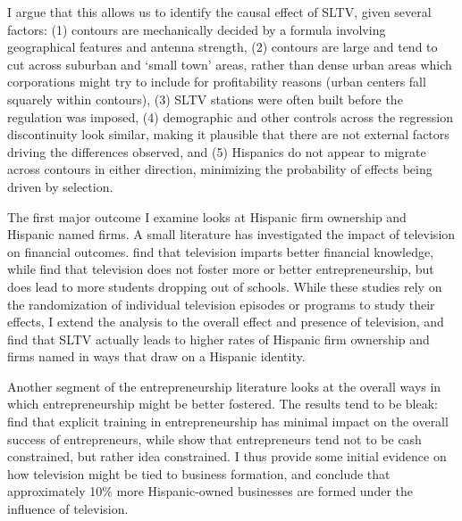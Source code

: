 \documentclass[11pt]{article}
\begin{document}
I argue that this allows us to identify the causal effect of SLTV, given several factors: (1) contours are mechanically decided by a formula involving geographical features and antenna strength, (2) contours are large and tend to cut across suburban and `small town' areas, rather than dense urban areas which corporations might try to include for profitability reasons (urban centers fall squarely within contours), (3) SLTV stations were often built before the regulation was imposed, (4) demographic and other controls across the regression discontinuity look similar, making it plausible that there are not external factors driving the differences observed, and (5) Hispanics do not appear to migrate across contours in either direction, minimizing the probability of effects being driven by selection.

The first major outcome I examine looks at Hispanic firm ownership and Hispanic named firms. A small literature has investigated the impact of television on financial outcomes. \cite{bjorvatn_teaching_2019} find that television imparts better financial knowledge, while \cite{berg_harnessing_2017} find that television does not foster more or better entrepreneurship, but does lead to more students dropping out of schools. While these studies rely on the randomization of individual television episodes or programs to study their effects, I extend the analysis to the overall effect and presence of television, and find that SLTV actually leads to higher rates of Hispanic firm ownership and firms named in ways that draw on a Hispanic identity.

Another segment of the entrepreneurship literature looks at the overall ways in which entrepreneurship might be better fostered. The results tend to be bleak: \cite{karlan_teaching_2011} find that explicit training in entrepreneurship has minimal impact on the overall success of entrepreneurs, while \cite{gine_money_2014} show that entrepreneurs tend not to be cash constrained, but rather idea constrained. I thus provide some initial evidence on how television might be tied to business formation, and conclude that approximately 10\% more Hispanic-owned businesses are formed under the influence of television. 

\end{document}
